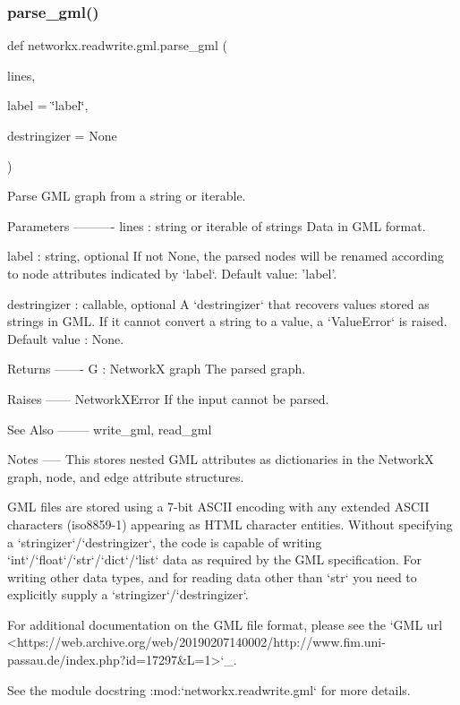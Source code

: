 \subsubsection{\texorpdfstring{parse\+\_\+gml()}{parse\_gml()}}
{\footnotesize\ttfamily def networkx.\+readwrite.\+gml.\+parse\+\_\+gml (\begin{DoxyParamCaption}\item[{}]{lines,  }\item[{}]{label = {\ttfamily \char`\"{}label\char`\"{}},  }\item[{}]{destringizer = {\ttfamily None} }\end{DoxyParamCaption})}

\begin{DoxyVerb}Parse GML graph from a string or iterable.

Parameters
----------
lines : string or iterable of strings
   Data in GML format.

label : string, optional
    If not None, the parsed nodes will be renamed according to node
    attributes indicated by `label`. Default value: 'label'.

destringizer : callable, optional
    A `destringizer` that recovers values stored as strings in GML. If it
    cannot convert a string to a value, a `ValueError` is raised. Default
    value : None.

Returns
-------
G : NetworkX graph
    The parsed graph.

Raises
------
NetworkXError
    If the input cannot be parsed.

See Also
--------
write_gml, read_gml

Notes
-----
This stores nested GML attributes as dictionaries in the NetworkX graph,
node, and edge attribute structures.

GML files are stored using a 7-bit ASCII encoding with any extended
ASCII characters (iso8859-1) appearing as HTML character entities.
Without specifying a `stringizer`/`destringizer`, the code is capable of
writing `int`/`float`/`str`/`dict`/`list` data as required by the GML
specification.  For writing other data types, and for reading data other
than `str` you need to explicitly supply a `stringizer`/`destringizer`.

For additional documentation on the GML file format, please see the
`GML url <https://web.archive.org/web/20190207140002/http://www.fim.uni-passau.de/index.php?id=17297&L=1>`_.

See the module docstring :mod:`networkx.readwrite.gml` for more details.
\end{DoxyVerb}
 \mbox{\label{namespacenetworkx_1_1readwrite_1_1gml_a2be87cb4d9130d4b78fc03880374741e}} 
